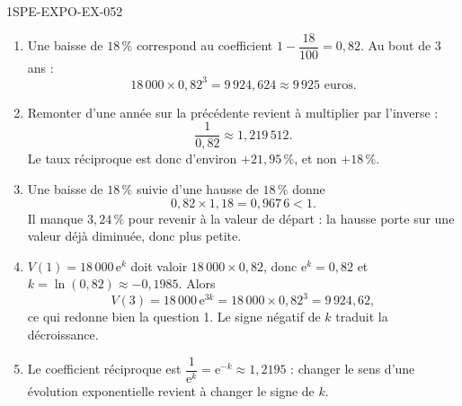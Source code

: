 \begin{corrige}{1SPE-EXPO-EX-052}
\begin{enumerate}
\item Une baisse de $18\,\%$ correspond au coefficient
  $1 - \dfrac{18}{100} = 0{,}82$. Au bout de $3$ ans :
  \[
    18\,000 \times 0{,}82^3 = 9\,924{,}624 \approx 9\,925 \text{ euros.}
  \]

\item Remonter d'une année sur la précédente revient à multiplier par
  l'inverse :
  \[
    \frac{1}{0{,}82} \approx 1{,}219\,512 .
  \]
  Le taux réciproque est donc d'environ $+21{,}95\,\%$, et non $+18\,\%$.

\item Une baisse de $18\,\%$ suivie d'une hausse de $18\,\%$ donne
  \[
    0{,}82 \times 1{,}18 = 0{,}967\,6 < 1 .
  \]
  Il manque $3{,}24\,\%$ pour revenir à la valeur de départ : la hausse porte
  sur une valeur déjà diminuée, donc plus petite.

\item $V(1) = 18\,000\,\mathrm{e}^{k}$ doit valoir $18\,000 \times 0{,}82$,
  donc $\mathrm{e}^{k} = 0{,}82$ et $k = \ln(0{,}82) \approx -0{,}1985$.
  Alors
  \[
    V(3) = 18\,000\,\mathrm{e}^{3k} = 18\,000 \times 0{,}82^3 = 9\,924{,}62,
  \]
  ce qui redonne bien la question 1. Le signe négatif de $k$ traduit la
  décroissance.

\item Le coefficient réciproque est $\dfrac{1}{\mathrm{e}^{k}} =
  \mathrm{e}^{-k} \approx 1{,}2195$ : changer le sens d'une évolution
  exponentielle revient à changer le signe de $k$.
\end{enumerate}
\end{corrige}
